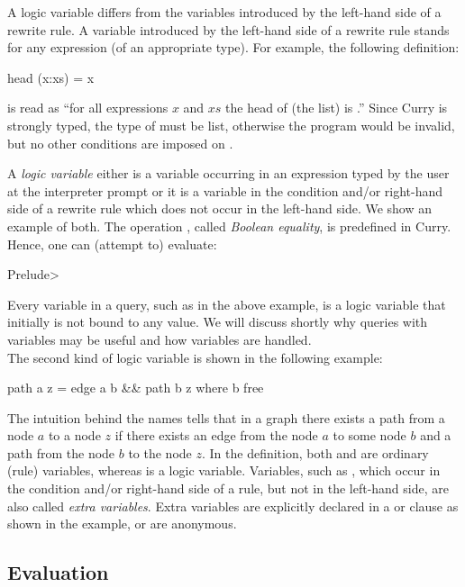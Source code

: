 A logic variable differs from the variables introduced by the left-hand
side of a rewrite rule.
A variable introduced by the left-hand side of a rewrite rule
stands for any expression (of an appropriate type).
For example, the following definition:
%
\begin{prog}
head (x:xs) = x
\end{prog}
%
is read as ``for all expressions $x$ and $xs$ the head of (the list)
 is .''
Since Curry is strongly typed, the type of  must be list,
otherwise the program would be invalid,
but no other conditions are imposed on . 

A \emph{logic variable} either is a variable occurring in an expression
typed by the user at the interpreter prompt or
it is a variable in the condition and/or right-hand side of
a rewrite rule which does not occur in the left-hand side.
We show an example of both.
The operation \ccode{==},
called \emph{Boolean equality},
is predefined in Curry.
Hence, one can (attempt to) evaluate:
%
\begin{prog}
Prelude> 
\end{prog}
%
Every variable in a query, such as  in the above example,
is a logic variable that initially is not bound to any value.
We will discuss shortly why queries with variables
may be useful and how variables are handled.
\\[1ex]
The second kind of logic variable is shown in the following
example:
%
\begin{prog}
path a z = edge a b \&\& path b z   where b free
\end{prog}
%
The intuition behind the names tells that in a graph there exists a path
from a node $a$ to a node $z$ if there exists an edge from
the node $a$ to some node $b$ and a path from the node $b$
to the node $z$.
In the definition, both  and  are ordinary (rule)
variables, whereas  is a logic variable.
Variables, such as , which occur in the condition
and/or right-hand side of a rule, but not in the left-hand side,
are also called \emph{extra variables}.
Extra variables are explicitly declared 
in a  or  clause as shown in the example,
or are anonymous.

\subsection{Evaluation}

